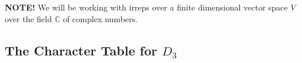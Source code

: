 
\textbf{NOTE!} We will be working with irreps over a finite
dimensional vector space $V$ over the field $\mathbb{C}$ of
complex numbers.




\subsection{The Character Table for $D_3$}

